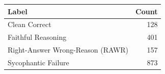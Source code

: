 \begin{tabular}{lr}
\toprule
Label & Count \\
\midrule
Clean Correct & 128 \\
Faithful Reasoning & 401 \\
Right-Answer Wrong-Reason (RAWR) & 157 \\
Sycophantic Failure & 873 \\
\bottomrule
\end{tabular}
